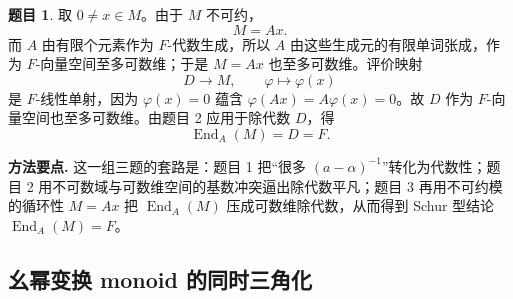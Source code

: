 \documentclass[a4paper]{ctexart}
\theoremstyle{definition}
\newtheorem{example}{题目}[section]
\theoremstyle{analysis}
\theoremstyle{plain}
\begin{document}
\begin{example}
取 \(0\neq x\in M\)。由于 \(M\) 不可约，
\[
  M=Ax.
\]
而 \(A\) 由有限个元素作为 \(F\)-代数生成，所以 \(A\) 由这些生成元的有限单词张成，作为 \(F\)-向量空间至多可数维；于是 \(M=Ax\) 也至多可数维。评价映射
\[
  D\longrightarrow M,\qquad \varphi\longmapsto \varphi(x)
\]
是 \(F\)-线性单射，因为 \(\varphi(x)=0\) 蕴含 \(\varphi(Ax)=A\varphi(x)=0\)。故 \(D\) 作为 \(F\)-向量空间也至多可数维。由题目 2 应用于除代数 \(D\)，得
\[
  \operatorname{End}_A(M)=D=F.
\]

\textbf{方法要点.}
这一组三题的套路是：题目 1 把“很多 \((a-\alpha)^{-1}\)”转化为代数性；题目 2 用不可数域与可数维空间的基数冲突逼出除代数平凡；题目 3 再用不可约模的循环性 \(M=Ax\) 把 \(\operatorname{End}_A(M)\) 压成可数维除代数，从而得到 Schur 型结论 \(\operatorname{End}_A(M)=F\)。
\end{example}

\subsection{幺幂变换 monoid 的同时三角化}\label{subsec:problem-kolchin-unipotent-monoid}
\end{document}
